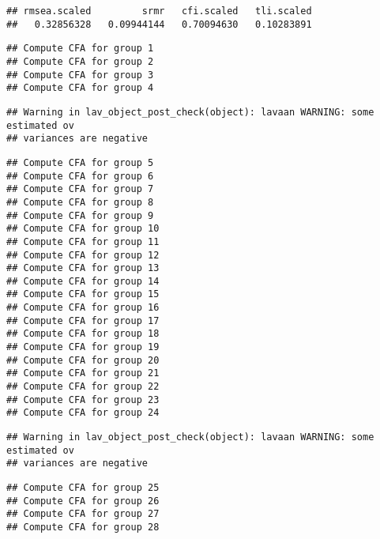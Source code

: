 \documentclass[
]{article}
\newenvironment{Shaded}{\begin{snugshade}}{\end{snugshade}}
\newcommand{\AttributeTok}[1]{\textcolor[rgb]{0.77,0.63,0.00}{#1}}
\newcommand{\CommentTok}[1]{\textcolor[rgb]{0.56,0.35,0.01}{\textit{#1}}}
\newcommand{\FunctionTok}[1]{\textcolor[rgb]{0.00,0.00,0.00}{#1}}
\newcommand{\NormalTok}[1]{#1}
\newcommand{\OtherTok}[1]{\textcolor[rgb]{0.56,0.35,0.01}{#1}}
\newcommand{\SpecialCharTok}[1]{\textcolor[rgb]{0.00,0.00,0.00}{#1}}
\begin{document}
\begin{verbatim}
## rmsea.scaled         srmr   cfi.scaled   tli.scaled 
##   0.32856328   0.09944144   0.70094630   0.10283891
\end{verbatim}

\begin{Shaded}
\end{Shaded}

\begin{verbatim}
## Compute CFA for group 1
## Compute CFA for group 2
## Compute CFA for group 3
## Compute CFA for group 4
\end{verbatim}

\begin{verbatim}
## Warning in lav_object_post_check(object): lavaan WARNING: some estimated ov
## variances are negative
\end{verbatim}

\begin{verbatim}
## Compute CFA for group 5
## Compute CFA for group 6
## Compute CFA for group 7
## Compute CFA for group 8
## Compute CFA for group 9
## Compute CFA for group 10
## Compute CFA for group 11
## Compute CFA for group 12
## Compute CFA for group 13
## Compute CFA for group 14
## Compute CFA for group 15
## Compute CFA for group 16
## Compute CFA for group 17
## Compute CFA for group 18
## Compute CFA for group 19
## Compute CFA for group 20
## Compute CFA for group 21
## Compute CFA for group 22
## Compute CFA for group 23
## Compute CFA for group 24
\end{verbatim}

\begin{verbatim}
## Warning in lav_object_post_check(object): lavaan WARNING: some estimated ov
## variances are negative
\end{verbatim}

\begin{verbatim}
## Compute CFA for group 25
## Compute CFA for group 26
## Compute CFA for group 27
## Compute CFA for group 28
\end{verbatim}
\end{document}
